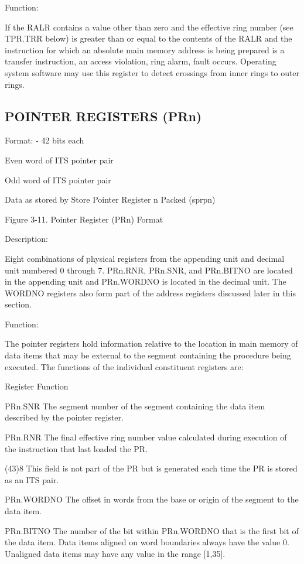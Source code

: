 Function:

If the RALR contains a value other than zero and the effective ring number (see
TPR.TRR below) is greater than or equal to the contents of the RALR and the
instruction for which an absolute main memory address is being prepared is a
transfer instruction, an access violation, ring alarm, fault occurs. Operating
system software may use this register to detect crossings from inner rings to
outer rings.

\subsection{POINTER REGISTERS (PRn)}

Format: - 42 bits each

Even word of ITS pointer pair

Odd word of ITS pointer pair

Data as stored by Store Pointer Register n Packed (sprpn)

Figure 3-11. Pointer Register (PRn) Format

Description:

Eight combinations of physical registers from the appending unit and decimal
unit numbered 0 through 7. PRn.RNR, PRn.SNR, and PRn.BITNO are located in the
appending unit and PRn.WORDNO is located in the decimal unit. The WORDNO
registers also form part of the address registers discussed later in this
section.

Function:

The pointer registers hold information relative to the location in main memory
of data items that may be external to the segment containing the procedure
being executed. The functions of the individual constituent registers are:

Register Function

PRn.SNR The segment number of the segment containing the data item described by
the pointer register.

PRn.RNR The final effective ring number value calculated during execution of
the instruction that last loaded the PR.

(43)8 This field is not part of the PR but is generated each time the PR is
stored as an ITS pair.

PRn.WORDNO The offset in words from the base or origin of the segment to the
data item.

PRn.BITNO The number of the bit within PRn.WORDNO that is the first bit of the
data item. Data items aligned on word boundaries always have the value 0.
Unaligned data items may have any value in the range [1,35].

